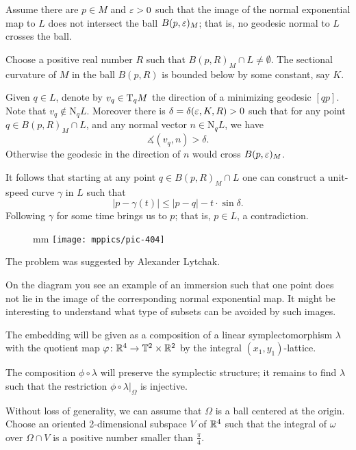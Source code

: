  
Assume there are $p\in M$ and $\varepsilon>0$ 
such that the image of the normal exponential map to $L$
 does not intersect the ball $B(p,\varepsilon)_M$; that is, no geodesic normal to $L$ crosses the ball.

Choose a positive real number $R$ such that $B(p,R)_M\cap L\ne \emptyset$.
The sectional curvature of $M$ in the ball $B(p,R)$
is bounded below by some constant, say $K$.

Given $q\in L$, denote by $v_q \in \mathrm{T}_qM$ the direction of a minimizing geodesic $[qp]$.
Note that $v_q\notin \mathrm{N}_qL$.
Moreover there is $\delta=\delta(\eps,K,R)\z>0$ 
such that for any point $q\in B(p,R)_M\cap L$,
and any normal vector $n\in \mathrm{N}_qL$,
we have 
\[\measuredangle (v_q,n)>\delta.\]
Otherwise the geodesic in the direction of $n$ would cross $B(p,\varepsilon)_M$.

It follows that starting at any point $q\in B(p,R)_M\cap L$ 
one can construct a unit-speed curve $\gamma$ in $L$ such that 
\[|p-\gamma(t)|\le |p-q|-t\cdot\sin \delta.\]
Following $\gamma$ for some time brings us to $p$;
that is, $p\in L$, a contradiction.
\qeds

{

\begin{figure}
 mm
\centering
\texttt{[image: mppics/pic-404]}
\end{figure}

The problem was suggested by Alexander Lytchak.

On the diagram you see an example of an immersion 
such that one point does not lie in the image of the corresponding normal exponential map.
It might be interesting to understand what type of subsets can be avoided by such images.

}
The embedding will be given as a composition of a linear symplectomorphism $\lambda$ 
with the quotient map $\varphi\colon\mathbb{R}^4\to \mathbb{T}^2\times\mathbb{R}^2$ by the integral $(x_1,y_1)$-lattice.

\medskip

The composition $\phi\circ\lambda$ will preserve the symplectic structure;
it remains to find $\lambda$ such that the restriction $\phi\circ\lambda|_\Omega$
is injective.

Without loss of generality,
we can assume that $\Omega$ is a ball centered at the origin.
Choose an oriented 2-dimensional subspace $V$ of $\mathbb{R}^4$ 
such that the integral of $\omega$ over 
$\Omega\cap V$ is a  positive number smaller than $\tfrac\pi4$. 

